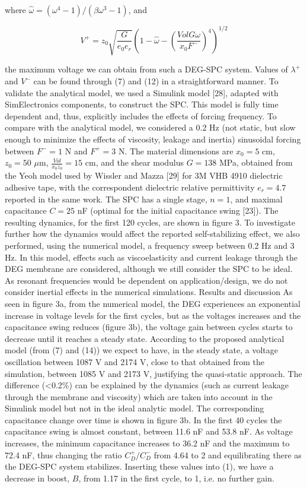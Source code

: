 where $\hat{\omega} = (\omega^4-1)/(\beta\omega^3-1)$, and

\begin{equation}
V^+=z_0 \sqrt{\frac{G}{e_0e_r}}\left(1-\hat{\omega}-\left(\frac{Vol G\omega}{x_0 F^- }\right)^{4}\right)^{1/2}
\end{equation}

the maximum voltage we can obtain from such a DEG-SPC system. Values of $\lambda^+$ and $V^-$ can be found through (7) and (12) in a straightforward manner.
To validate the analytical model, we used a Simulink model [28], adapted with SimElectronics components, to construct the SPC. This model is fully time dependent and, thus, explicitly includes the effects of forcing frequency. To compare with the analytical model, we considered a 0.2 Hz (not static, but slow enough to minimize the effects of viscosity, leakage and inertia) sinusoidal forcing between $F^-=1$ N and $F^+=3$ N. The material dimensions are $x_0=5$ cm, $z_0=50$ $\mu$m, $\frac{Vol}{x_0 z_0}=15$ cm, and the shear modulus $G= 138$ MPa, obtained from the Yeoh model used by Wissler and Mazza [29] for 3M VHB 4910 dielectric adhesive tape, with the correspondent dielectric relative permittivity $e_r=4.7$ reported in the same work. The SPC has a single stage, $n=1$, and maximal capacitance $C=25$ nF (optimal for the initial capacitance swing [23]). The resulting dynamics, for the first 120 cycles, are shown in figure 3.
To investigate further how the dynamics would affect the reported self-stabilizing effect, we also performed, using the numerical model, a frequency sweep between 0.2 Hz and 3 Hz. In this model, effects such as viscoelasticity and current leakage through the DEG membrane are considered, although we still consider the SPC to be ideal. As resonant frequencies would be dependent on application/design, we do not consider inertial effects in the numerical simulations.
	Results and discussion
As seen in figure 3a, from the numerical model, the DEG experiences an exponential increase in voltage levels for the first cycles, but as the voltages increases and the capacitance swing reduces (figure 3b), the voltage gain between cycles starts to decrease until it reaches a steady state. According to the proposed analytical model (from (7) and (14)) we expect to have, in the steady state, a voltage oscillation between 1087 V and 2174 V, close to that obtained from the simulation, between 1085 V and 2173 V, justifying the quasi-static approach. The difference (<0.2\%) can be explained by the dynamics (such as current leakage through the membrane and viscosity) which are taken into account in the Simulink model but not in the ideal analytic model. 
The corresponding capacitance change over time is shown in figure 3b. In the first 40 cycles the capacitance swing is almost constant, between 11.6 nF and 53.8 nF. As voltage increases, the minimum capacitance increases to 36.2 nF and the maximum to 72.4 nF, thus changing the ratio $C_D^+/C_D^-$ from 4.64 to 2 and equilibrating there as the DEG-SPC system stabilizes. Inserting these values into (1), we have a decrease in boost, $B$, from 1.17 in the first cycle, to 1, i.e. no further gain. 

